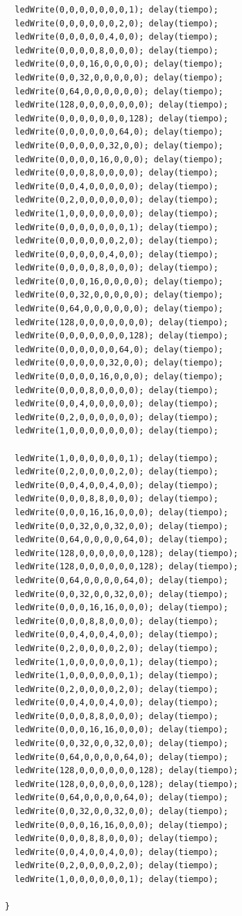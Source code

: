 \documentclass{article}
\begin{document}
\begin{verbatim}
  ledWrite(0,0,0,0,0,0,0,1); delay(tiempo);
  ledWrite(0,0,0,0,0,0,2,0); delay(tiempo);
  ledWrite(0,0,0,0,0,4,0,0); delay(tiempo);
  ledWrite(0,0,0,0,8,0,0,0); delay(tiempo);
  ledWrite(0,0,0,16,0,0,0,0); delay(tiempo);
  ledWrite(0,0,32,0,0,0,0,0); delay(tiempo);
  ledWrite(0,64,0,0,0,0,0,0); delay(tiempo);
  ledWrite(128,0,0,0,0,0,0,0); delay(tiempo);
  ledWrite(0,0,0,0,0,0,0,128); delay(tiempo);
  ledWrite(0,0,0,0,0,0,64,0); delay(tiempo);
  ledWrite(0,0,0,0,0,32,0,0); delay(tiempo);
  ledWrite(0,0,0,0,16,0,0,0); delay(tiempo);
  ledWrite(0,0,0,8,0,0,0,0); delay(tiempo);
  ledWrite(0,0,4,0,0,0,0,0); delay(tiempo);
  ledWrite(0,2,0,0,0,0,0,0); delay(tiempo);
  ledWrite(1,0,0,0,0,0,0,0); delay(tiempo);
  ledWrite(0,0,0,0,0,0,0,1); delay(tiempo);
  ledWrite(0,0,0,0,0,0,2,0); delay(tiempo);
  ledWrite(0,0,0,0,0,4,0,0); delay(tiempo);
  ledWrite(0,0,0,0,8,0,0,0); delay(tiempo);
  ledWrite(0,0,0,16,0,0,0,0); delay(tiempo);
  ledWrite(0,0,32,0,0,0,0,0); delay(tiempo);
  ledWrite(0,64,0,0,0,0,0,0); delay(tiempo);
  ledWrite(128,0,0,0,0,0,0,0); delay(tiempo);
  ledWrite(0,0,0,0,0,0,0,128); delay(tiempo);
  ledWrite(0,0,0,0,0,0,64,0); delay(tiempo);
  ledWrite(0,0,0,0,0,32,0,0); delay(tiempo);
  ledWrite(0,0,0,0,16,0,0,0); delay(tiempo);
  ledWrite(0,0,0,8,0,0,0,0); delay(tiempo);
  ledWrite(0,0,4,0,0,0,0,0); delay(tiempo);
  ledWrite(0,2,0,0,0,0,0,0); delay(tiempo);
  ledWrite(1,0,0,0,0,0,0,0); delay(tiempo);
  
  ledWrite(1,0,0,0,0,0,0,1); delay(tiempo);
  ledWrite(0,2,0,0,0,0,2,0); delay(tiempo);
  ledWrite(0,0,4,0,0,4,0,0); delay(tiempo);
  ledWrite(0,0,0,8,8,0,0,0); delay(tiempo);
  ledWrite(0,0,0,16,16,0,0,0); delay(tiempo);
  ledWrite(0,0,32,0,0,32,0,0); delay(tiempo);
  ledWrite(0,64,0,0,0,0,64,0); delay(tiempo);
  ledWrite(128,0,0,0,0,0,0,128); delay(tiempo);
  ledWrite(128,0,0,0,0,0,0,128); delay(tiempo);
  ledWrite(0,64,0,0,0,0,64,0); delay(tiempo);
  ledWrite(0,0,32,0,0,32,0,0); delay(tiempo);
  ledWrite(0,0,0,16,16,0,0,0); delay(tiempo);
  ledWrite(0,0,0,8,8,0,0,0); delay(tiempo);
  ledWrite(0,0,4,0,0,4,0,0); delay(tiempo);
  ledWrite(0,2,0,0,0,0,2,0); delay(tiempo);
  ledWrite(1,0,0,0,0,0,0,1); delay(tiempo);
  ledWrite(1,0,0,0,0,0,0,1); delay(tiempo);
  ledWrite(0,2,0,0,0,0,2,0); delay(tiempo);
  ledWrite(0,0,4,0,0,4,0,0); delay(tiempo);
  ledWrite(0,0,0,8,8,0,0,0); delay(tiempo);
  ledWrite(0,0,0,16,16,0,0,0); delay(tiempo);
  ledWrite(0,0,32,0,0,32,0,0); delay(tiempo);
  ledWrite(0,64,0,0,0,0,64,0); delay(tiempo);
  ledWrite(128,0,0,0,0,0,0,128); delay(tiempo);
  ledWrite(128,0,0,0,0,0,0,128); delay(tiempo);
  ledWrite(0,64,0,0,0,0,64,0); delay(tiempo);
  ledWrite(0,0,32,0,0,32,0,0); delay(tiempo);
  ledWrite(0,0,0,16,16,0,0,0); delay(tiempo);
  ledWrite(0,0,0,8,8,0,0,0); delay(tiempo);
  ledWrite(0,0,4,0,0,4,0,0); delay(tiempo);
  ledWrite(0,2,0,0,0,0,2,0); delay(tiempo);
  ledWrite(1,0,0,0,0,0,0,1); delay(tiempo);
  
}

\end{verbatim}
\end{document}
